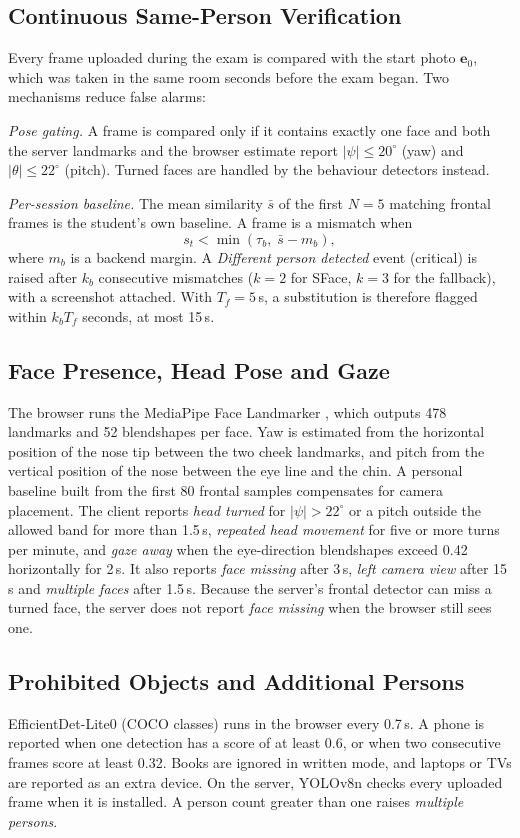 \documentclass[conference]{IEEEtran}
\begin{document}
\subsection{Continuous Same-Person Verification}
Every frame uploaded during the exam is compared with the start photo $\mathbf{e}_0$, which was taken in the same room seconds before the exam began. Two mechanisms reduce false alarms:

\emph{Pose gating.} A frame is compared only if it contains exactly one face and both the server landmarks and the browser estimate report $|\psi|\le 20^\circ$ (yaw) and $|\theta|\le 22^\circ$ (pitch). Turned faces are handled by the behaviour detectors instead.

\emph{Per-session baseline.} The mean similarity $\bar{s}$ of the first $N=5$ matching frontal frames is the student's own baseline. A frame is a mismatch when
\begin{equation}
s_t < \min\left(\tau_b,\; \bar{s} - m_b\right),
\end{equation}
where $m_b$ is a backend margin. A \emph{Different person detected} event (critical) is raised after $k_b$ consecutive mismatches ($k=2$ for SFace, $k=3$ for the fallback), with a screenshot attached. With $T_f=5$\,s, a substitution is therefore flagged within $k_bT_f$ seconds, at most 15\,s.

\subsection{Face Presence, Head Pose and Gaze}
The browser runs the MediaPipe Face Landmarker \cite{kartynnik2019facemesh}, which outputs 478 landmarks and 52 blendshapes per face. Yaw is estimated from the horizontal position of the nose tip between the two cheek landmarks, and pitch from the vertical position of the nose between the eye line and the chin. A personal baseline built from the first 80 frontal samples compensates for camera placement. The client reports \emph{head turned} for $|\psi|>22^\circ$ or a pitch outside the allowed band for more than 1.5\,s, \emph{repeated head movement} for five or more turns per minute, and \emph{gaze away} when the eye-direction blendshapes exceed 0.42 horizontally for 2\,s. It also reports \emph{face missing} after 3\,s, \emph{left camera view} after 15\,s and \emph{multiple faces} after 1.5\,s. Because the server's frontal detector can miss a turned face, the server does not report \emph{face missing} when the browser still sees one.

\subsection{Prohibited Objects and Additional Persons}
EfficientDet-Lite0 \cite{tan2020efficientdet} (COCO classes) runs in the browser every 0.7\,s. A phone is reported when one detection has a score of at least 0.6, or when two consecutive frames score at least 0.32. Books are ignored in written mode, and laptops or TVs are reported as an extra device. On the server, YOLOv8n \cite{jocher2023yolov8} checks every uploaded frame when it is installed. A person count greater than one raises \emph{multiple persons}.
\end{document}

